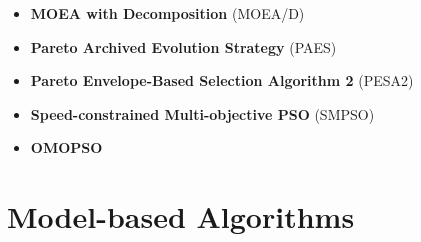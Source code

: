 \begin{itemize}
	\item \textbf{\ac{MOEA} with Decomposition} (MOEA/D)
	
	\item \textbf{Pareto Archived Evolution Strategy} (PAES)
	
	\item \textbf{Pareto Envelope-Based Selection Algorithm 2} (PESA2)
	
	\item \textbf{Speed-constrained Multi-objective \ac{PSO}} (SMPSO)
	
	\item \textbf{OMOPSO}
	
\end{itemize}

\section{Model-based Algorithms}
